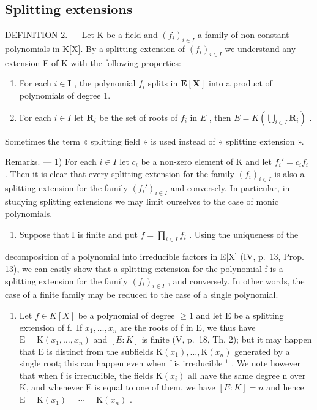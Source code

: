 \subsection{Splitting extensions}

DEFINITION 2. --- Let K be a field and \((f_{i})_{i\in I}\) a family of non-constant polynomials in K{[}X{]}. By a splitting extension of \((f_{i})_{i\in I}\) we understand any extension E of K with the following properties:

\begin{enumerate}
\def\labelenumi{\alph{enumi})}
\item
  For each \(i \in \mathbf{I}\) , the polynomial \(f_i\) splits in \(\mathbf{E}[\mathbf{X}]\) into a product of polynomials of degree 1.
\item
  For each \(i \in I\) let \(\mathbf{R}_i\) be the set of roots of \(f_i\) in \(E\) , then \(E = K\left(\bigcup_{i \in I} \mathbf{R}_i\right)\) .
\end{enumerate}

Sometimes the term « splitting field » is used instead of « splitting extension ».

Remarks. --- 1) For each \(i \in I\) let \(c_i\) be a non-zero element of K and let \(f_i' = c_i f_i\) . Then it is clear that every splitting extension for the family \((f_i)_{i \in I}\) is also a splitting extension for the family \((f_i')_{i \in I}\) and conversely. In particular, in studying splitting extensions we may limit ourselves to the case of monic polynomials.

\begin{enumerate}
\def\labelenumi{\arabic{enumi})}
\setcounter{enumi}{1}
\tightlist
\item
  Suppose that I is finite and put \(f = \prod_{i \in I} f_i\) . Using the uniqueness of the
\end{enumerate}

decomposition of a polynomial into irreducible factors in E{[}X{]} (IV, p.~13, Prop. 13), we can easily show that a splitting extension for the polynomial f is a splitting extension for the family \((f_{i})_{i \in I}\) , and conversely. In other words, the case of a finite family may be reduced to the case of a single polynomial.

\begin{enumerate}
\def\labelenumi{\arabic{enumi})}
\setcounter{enumi}{2}
\tightlist
\item
  Let \(f \in K[X]\) be a polynomial of degree \(\geqslant 1\) and let E be a splitting extension of f.~If \(x_{1}, \ldots, x_{n}\) are the roots of f in E, we thus have \(\mathrm{E} = \mathrm{K}(x_{1}, \ldots, x_{n})\) and \([E : K]\) is finite (V, p.~18, Th. 2); but it may happen that E is distinct from the subfields \(\mathrm{K}(x_{1}), \ldots, \mathrm{K}(x_{n})\) generated by a single root; this can happen even when f is irreducible \(^{1}\) . We note however that when f is irreducible, the fields \(\mathrm{K}(x_{i})\) all have the same degree n over K, and whenever E is equal to one of them, we have \([E : K] = n\) and hence \(\mathrm{E} = \mathrm{K}(x_{1}) = \cdots = \mathrm{K}(x_{n})\) .
\end{enumerate}

